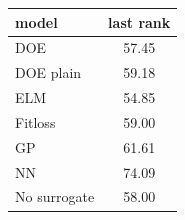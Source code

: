 \begin{tabular}{|lc|}
\hline
model & last rank\\
\hline
DOE & 57.45 \\
DOE plain & 59.18 \\
ELM & 54.85 \\
Fitloss & 59.00 \\
GP & 61.61 \\
NN & 74.09 \\
No surrogate & 58.00 \\
\hline
\end{tabular}
